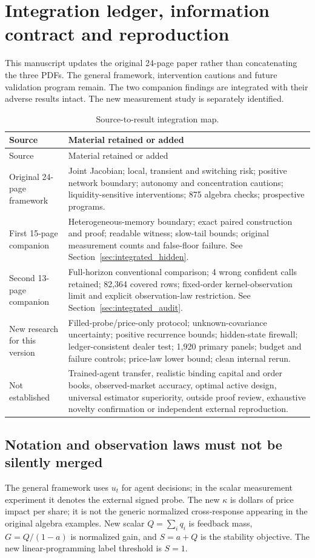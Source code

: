 \documentclass[11pt,a4paper]{article}
\theoremstyle{definition}
\theoremstyle{remark}
\begin{document}
\clearpage
\section{Integration ledger, information contract and reproduction}
\label{app:integration}
This manuscript updates the original 24-page paper rather than concatenating the three PDFs. The general framework, intervention cautions and future validation program remain. The two companion findings are integrated with their adverse results intact. The new measurement study is separately identified.

\begin{longtable}{p{}p{}}
\caption{Source-to-result integration map.}\\\toprule
Source & Material retained or added\\\midrule\endfirsthead
\toprule Source & Material retained or added\\\midrule\endhead
\bottomrule\endfoot
Original 24-page framework & Joint Jacobian; local, transient and switching risk; positive network boundary; autonomy and concentration cautions; liquidity-sensitive interventions; 875 algebra checks; prospective programs.\\
First 15-page companion & Heterogeneous-memory boundary; exact paired construction and proof; readable witness; slow-tail bounds; original measurement counts and false-floor failure. See Section~\ref{sec:integrated_hidden}.\\
Second 13-page companion & Full-horizon conventional comparison; 4 wrong confident calls retained; 82,364 covered rows; fixed-order kernel-observation limit and explicit observation-law restriction. See Section~\ref{sec:integrated_audit}.\\
New research for this version & Filled-probe/price-only protocol; unknown-covariance uncertainty; positive recurrence bounds; hidden-state firewall; ledger-consistent dealer test; 1,920 primary panels; budget and failure controls; price-law lower bound; clean internal rerun.\\
Not established & Trained-agent transfer, realistic binding capital and order books, observed-market accuracy, optimal active design, universal estimator superiority, outside proof review, exhaustive novelty confirmation or independent external reproduction.\\
\end{longtable}

\subsection{Notation and observation laws must not be silently merged}
The general framework uses $u_t$ for agent decisions; in the scalar measurement experiment it denotes the external signed probe. The new $\kappa$ is dollars of price impact per share; it is not the generic normalized cross-response appearing in the original algebra examples. New scalar $Q=\sum_iq_i$ is feedback mass, $G=Q/(1-a)$ is normalized gain, and $S=a+Q$ is the stability objective. The new linear-programming label threshold is $S=1$.
\end{document}
